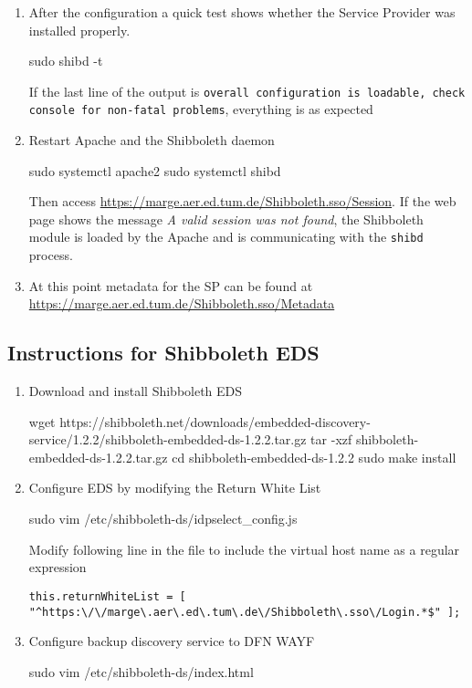 \begin{enumerate}
    Activate the Shibboleth module in Apache
    \begin{terminal}
        sudo a2enmod shib
    \end{terminal}
    \item After the configuration a quick test shows whether the Service
    Provider was installed properly.
    \begin{terminal}
        sudo shibd -t
    \end{terminal}
    If the last line of the output is \texttt{overall configuration is loadable,
    check console for non-fatal problems}, everything is as expected
    \item Restart Apache and the Shibboleth daemon
    \begin{terminal}
	    sudo systemctl apache2 
        sudo systemctl shibd
    \end{terminal}
    Then access \url{https://marge.aer.ed.tum.de/Shibboleth.sso/Session}. If the
    web page shows the message \textit{A valid session was not found}, the
    Shibboleth module is loaded by the Apache and is communicating with the
    \texttt{shibd} process.
    \item At this point metadata for the SP can be found at
    \url{https://marge.aer.ed.tum.de/Shibboleth.sso/Metadata}
\end{enumerate}

\subsection*{Instructions for Shibboleth EDS}

\begin{enumerate}
    \item Download and install Shibboleth EDS
    \begin{terminal}
        wget https://shibboleth.net/downloads/embedded-discovery-service/1.2.2/shibboleth-embedded-ds-1.2.2.tar.gz
        tar -xzf shibboleth-embedded-ds-1.2.2.tar.gz
        cd shibboleth-embedded-ds-1.2.2
        sudo make install
    \end{terminal}
    \item  Configure EDS by modifying the Return White List
    \begin{terminal}
        sudo vim /etc/shibboleth-ds/idpselect_config.js
    \end{terminal}
    Modify following line in the file to include the virtual host name as a
    regular expression
    \begin{lstlisting}[frame={l}]
        this.returnWhiteList = [ "^https:\/\/marge\.aer\.ed\.tum\.de\/Shibboleth\.sso\/Login.*$" ];
    \end{lstlisting}
    \item Configure backup discovery service to DFN WAYF
    \begin{terminal}
        sudo vim /etc/shibboleth-ds/index.html
    \end{terminal}
\end{enumerate}

